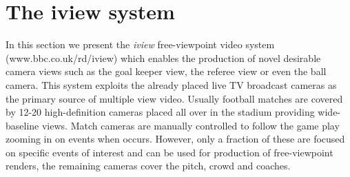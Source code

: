 \section{The iview system}
In this section we present the \textit{iview} free-viewpoint video
system (www.bbc.co.uk/rd/iview) which enables the production of novel desirable camera views such as 
the goal keeper view, the referee view or even the ball camera.
This system exploits the already placed live TV broadcast cameras as the primary
source of multiple view video.
Usually football matches are covered by 12-20 high-definition cameras placed all over in the stadium
providing wide-baseline views.
Match cameras are manually controlled to follow the game play zooming in on events when occurs.
However, only a fraction of these are focused on specific events of interest and can be used for production 
of free-viewpoint renders, the remaining cameras cover the pitch, crowd and coaches.






